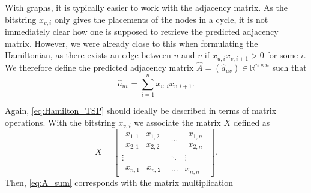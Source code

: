 With graphs, it is typically easier to work with the adjacency matrix.
As the bitstring $x_{v,i}$ only gives the placements of the nodes in a cycle, it is not immediately clear how one is supposed to retrieve the predicted adjacency matrix.
However, we were already close to this when formulating the Hamiltonian, as there exists an edge between $u$ and $v$ if $x_{u,i}x_{v,i+1} > 0$ for some $i$.
We therefore define the predicted adjacency matrix $\hat{A} = 
(\hat{a}_{uv}) \in \mathbb{R}^{n \times n}$ such that
\begin{equation}\label{eq:A_sum}
    \hat{a}_{uv} = \sum_{i = 1}^n x_{u,i} x_{v,i+1}. 
\end{equation}

Again, \eqref{eq:Hamilton_TSP} should ideally be described in terms of matrix operations.
With the bitstring $x_{v,i}$ we associate the matrix $X$ defined as
\begin{equation}
X = 
\begin{bmatrix}
    \begin{matrix}
        x_{1,1} & x_{1,2} \\
        x_{2,1} & x_{2,2}
    \end{matrix}
    & \cdots &
    \begin{matrix}
        x_{1,n} \\ x_{2,n}
    \end{matrix} \\
    \vdots & \ddots & \vdots \\
    \begin{matrix}
        x_{n,1} & x_{n,2}
    \end{matrix}
    & \hdots & x_{n,n}
\end{bmatrix}.
\end{equation}
Then, \eqref{eq:A_sum} corresponds with the matrix multiplication
